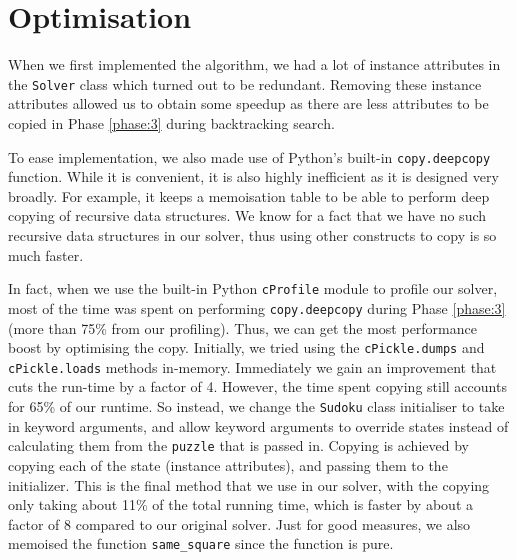 \documentclass[11pt, a4paper]{article}
\begin{document}
\section{Optimisation}
When we first implemented the algorithm, we had a lot of instance attributes in the \texttt{Solver} class which turned out to be redundant.
Removing these instance attributes allowed us to obtain some speedup as there are less attributes to be copied in Phase \ref{phase:3} during backtracking search.

To ease implementation, we also made use of Python's built-in \texttt{copy.deepcopy} function.
While it is convenient, it is also highly inefficient as it is designed very broadly.
For example, it keeps a memoisation table to be able to perform deep copying of recursive data structures.
We know for a fact that we have no such recursive data structures in our solver, thus using other constructs to copy is so much faster.

In fact, when we use the built-in Python \texttt{cProfile} module to profile our solver, most of the time was spent on performing \texttt{copy.deepcopy} during Phase \ref{phase:3} (more than 75\% from our profiling).
Thus, we can get the most performance boost by optimising the copy.
Initially, we tried using the \texttt{cPickle.dumps} and \texttt{cPickle.loads} methods in-memory.
Immediately we gain an improvement that cuts the run-time by a factor of 4.
However, the time spent copying still accounts for 65\% of our runtime.
So instead, we change the \texttt{Sudoku} class initialiser to take in keyword arguments, and allow keyword arguments to override states instead of calculating them from the \texttt{puzzle} that is passed in.
Copying is achieved by copying each of the state (instance attributes), and passing them to the initializer.
This is the final method that we use in our solver, with the copying only taking about 11\% of the total running time, which is faster by about a factor of 8 compared to our original solver. Just for good measures, we also memoised the function \texttt{same\_square} since the function is pure.
\end{document}
